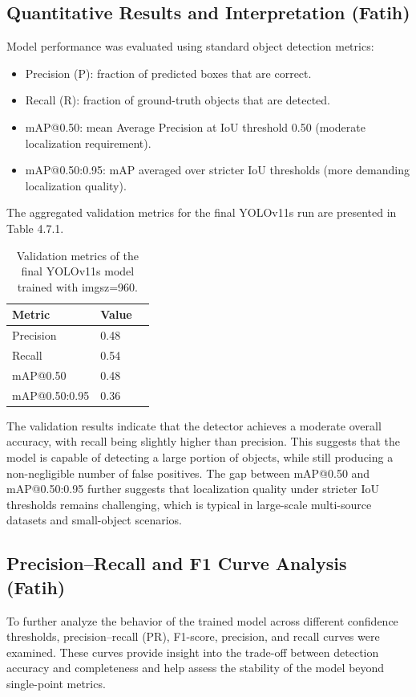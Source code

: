 \documentclass[12pt,a4paper]{report}
\begin{document}
\subsection{Quantitative Results and Interpretation (Fatih)}
Model performance was evaluated using standard object detection metrics:

\begin{itemize}
    \item Precision (P): fraction of predicted boxes that are correct.
    \item Recall (R): fraction of ground-truth objects that are detected.
    \item mAP@0.50: mean Average Precision at IoU threshold 0.50 (moderate localization requirement).
    \item mAP@0.50:0.95: mAP averaged over stricter IoU thresholds (more demanding localization quality).
\end{itemize}
The aggregated validation metrics for the final YOLOv11s run are presented in Table 4.7.1.

\begin{table}[H]
\centering
\caption[Validation metrics]{Validation metrics of the final YOLOv11s model trained with imgsz=960.}
\label{tab:values}
\begin{tabular}{lll}
\hline
\textbf{Metric} & \textbf{Value} \\
\hline
Precision & 0.48 \\
Recall & 0.54 \\
mAP@0.50 & 0.48 \\
mAP@0.50:0.95 & 0.36 \\
\hline
\end{tabular}
\end{table}
The validation results  indicate that the detector achieves a moderate overall accuracy, with recall being slightly higher than precision. This suggests that the model is capable of detecting a large portion of objects, while still producing a non-negligible number of false positives. The gap between mAP@0.50 and mAP@0.50:0.95 further suggests that localization quality under stricter IoU thresholds remains challenging, which is typical in large-scale multi-source datasets and small-object scenarios. 

\subsection{Precision–Recall and F1 Curve Analysis (Fatih)}
To further analyze the behavior of the trained model across different confidence thresholds, precision–recall (PR), F1-score, precision, and recall curves were examined. These curves provide insight into the trade-off between detection accuracy and completeness and help assess the stability of the model beyond single-point metrics.
\end{document}
